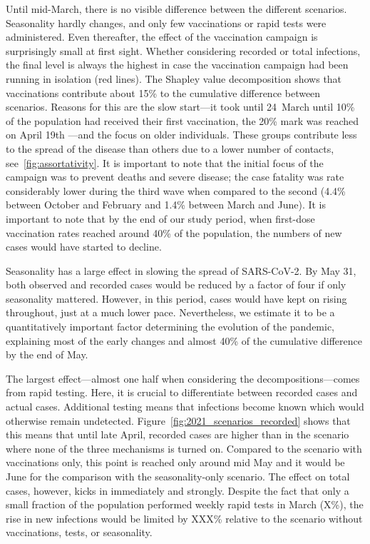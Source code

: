 Until mid-March, there is no visible difference between the different scenarios.
Seasonality hardly changes, and only few vaccinations or rapid tests were administered.
Even thereafter, the effect of the vaccination campaign is surprisingly small at first
sight. Whether considering recorded or total infections, the final level is always the
highest in case the vaccination campaign had been running in isolation (red lines). The
Shapley value decomposition shows that vaccinations contribute about
15\% to the cumulative difference between scenarios. Reasons for
this are the slow start---it took until 24~March until 10\% of the population had
received their first vaccination, the 20\% mark was reached on April 19th ---and the
focus on older individuals. These groups contribute less to the spread of the disease
than others due to a lower number of contacts, see~\ref{fig:assortativity}. It is
important to note that the initial focus of the campaign was to prevent deaths and
severe disease; the case fatality was rate considerably lower during the third wave when
compared to the second (4.4\% between October and February and 1.4\% between March and
June). It is important to note that by the end of our study period, when first-dose
vaccination rates reached around 40\% of the population, the numbers of new cases would
have started to decline.

Seasonality has a large effect in slowing the spread of SARS-CoV-2. By May 31, both
observed and recorded cases would be reduced by a factor of four if only seasonality
mattered. However, in this period, cases would have kept on rising throughout, just at a
much lower pace. Nevertheless, we estimate it to be a quantitatively important factor
determining the evolution of the pandemic, explaining most of the early changes and
almost 40\% of the cumulative difference by the end of May.

The largest effect---almost one half when considering the decompositions---comes from
rapid testing. Here, it is crucial to differentiate between recorded cases and actual
cases. Additional testing means that infections become known which would otherwise
remain undetected. Figure~\ref{fig:2021_scenarios_recorded} shows that this means that
until late April, recorded cases are higher than in the scenario where none of the three
mechanisms is turned on. Compared to the scenario with vaccinations only, this point is
reached only around mid May and it would be June for the comparison with the
seasonality-only scenario. The effect on total cases, however, kicks in immediately and
strongly. Despite the fact that only a small fraction of the population performed weekly
rapid tests in March (X\%), the rise in new infections would be
limited by XXX\% relative to the scenario without vaccinations, tests, or seasonality.

